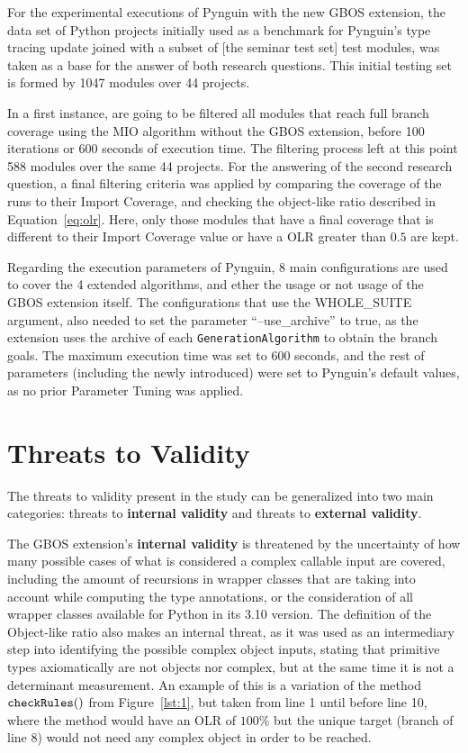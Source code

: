 \documentclass[%
  chapterprefix=false,%
  open=right,%
  twoside=true,%
  paper=a4,%
  logofile={Figures/logo.png},%
  thesistype=master,%
  UKenglish,%
]{se2thesis}
\newcommand{\classname}[1]{\texttt{#1}}
\newcommand{\callable}[2][]{\(\text{\texttt{#2}}(#1)\)}
\begin{document}
For the experimental executions of Pynguin with the new GBOS extension, the data set of Python projects initially used as a benchmark for Pynguin's type tracing update joined with a subset of [the seminar test set] test modules, was taken as a base for the answer of both research questions.
This initial testing set is formed by 1047 modules over 44 projects.

In a first instance, are going to be filtered all modules that reach full branch coverage using the MIO algorithm without the GBOS extension, before 100 iterations or 600 seconds of execution time.
The filtering process left at this point 588 modules over the same 44 projects.
For the answering of the second research question, a final filtering criteria was applied by comparing the coverage of the runs to their Import Coverage, and checking the object-like ratio described in Equation~\ref{eq:olr}.
Here, only those modules that have a final coverage that is different to their Import Coverage value or have a OLR greater than \(0.5\) are kept.

Regarding the execution parameters of Pynguin, 8 main configurations are used to cover the 4 extended algorithms, and ether the usage or not usage of the GBOS extension itself.
The configurations that use the WHOLE\_SUITE argument, also needed to set the parameter ``--use\_archive'' to true, as the extension uses the archive of each \classname{GenerationAlgorithm} to obtain the branch goals.
The maximum execution time was set to 600 seconds, and the rest of parameters (including the newly introduced) were set to Pynguin's default values, as no prior Parameter Tuning was applied. 

\section{Threats to Validity}

The threats to validity present in the study can be generalized into two main categories: threats to \textbf{internal validity} and threats to \textbf{external validity}.

The GBOS extension's \textbf{internal validity} is threatened by the uncertainty of how many possible cases of what is considered a complex callable input are covered, including the amount of recursions in wrapper classes that are taking into account while computing the type annotations, or the consideration of all wrapper classes available for Python in its 3.10 version.
The definition of the Object-like ratio also makes an internal threat, as it was used as an intermediary step into identifying the possible complex object inputs, stating that primitive types axiomatically are not objects nor complex, but at the same time it is not a determinant measurement.
An example of this is a variation of the method \callable[]{checkRules} from Figure~\ref{lst:1}, but taken from line 1 until before line 10, where the method would have an OLR of \(100\%\) but the unique target (branch of line 8) would not need any complex object in order to be reached.
\end{document}
